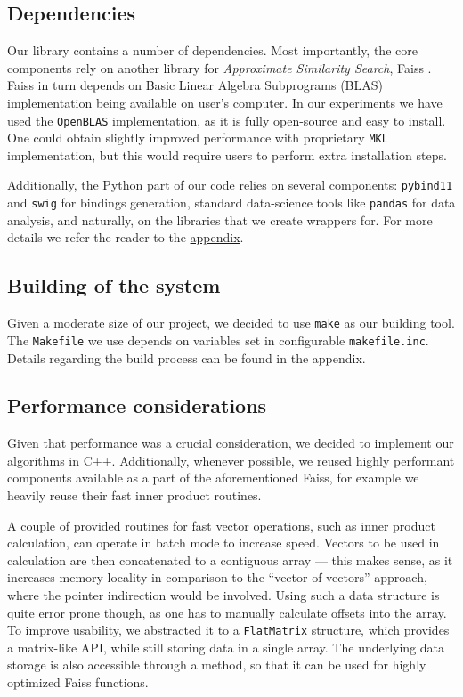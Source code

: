 
\subsection{Dependencies}

Our library contains a number of dependencies. Most importantly, the core components rely on 
another library for \textit{Approximate Similarity Search}, Faiss \cite{faiss}.
Faiss in turn depends on Basic Linear Algebra Subprograms (BLAS) implementation being available on user's computer.
In our experiments we have used the \texttt{OpenBLAS} \cite{openblas} implementation, as it is fully
open-source and easy to install. One could obtain slightly improved performance with proprietary
\texttt{MKL} \cite{mkl} implementation, but this would require users to perform extra installation steps.

Additionally, the Python part of our code relies on several components: \texttt{pybind11} and \texttt{swig}
for bindings generation, standard data-science tools like \texttt{pandas} for data analysis, and naturally, on the
libraries that we create wrappers for. For more details we refer the reader to the \hyperref[sec:appendices]{appendix}.

\subsection{Building of the system}

Given a moderate size of our project, we decided to use \texttt{make} as our building tool. The \texttt{Makefile} we use
depends on variables set in configurable \texttt{makefile.inc}. Details regarding the build process can be found in the appendix.

\subsection{Performance considerations}

Given that performance was a crucial consideration, we decided to implement our algorithms in C++.
Additionally, whenever possible, we reused highly performant components available as a part of the aforementioned Faiss,
for example we heavily reuse their fast inner product routines. 

A couple of provided routines for fast vector operations, such as inner product calculation, can
operate in batch mode to increase speed. Vectors to be used in calculation are then concatenated
to a contiguous array --- this makes sense, as it increases memory locality in comparison
to the ``vector of vectors'' approach, where the pointer indirection would be involved. Using such a data structure
is quite error prone though, as one has to manually calculate offsets into the array. To improve
usability, we abstracted it to a \texttt{FlatMatrix} structure, which provides a matrix-like API, while
still storing data in a single array. The underlying data storage is also accessible through a method,
so that it can be used for highly optimized Faiss functions.

